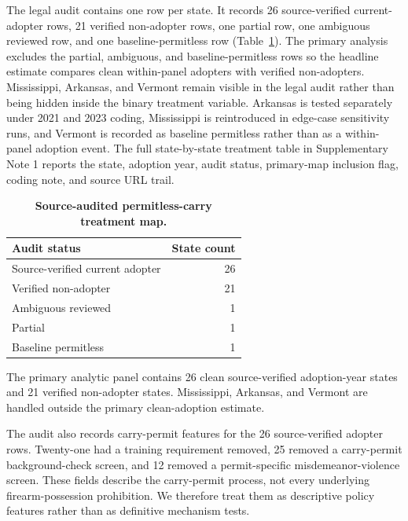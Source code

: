 \documentclass[11pt]{article}
\begin{document}
The legal audit contains one row per state. It records 26 source-verified current-adopter rows, 21 verified non-adopter rows, one partial row, one ambiguous reviewed row, and one baseline-permitless row (Table~\ref{tab:audit}). The primary analysis excludes the partial, ambiguous, and baseline-permitless rows so the headline estimate compares clean within-panel adopters with verified non-adopters. Mississippi, Arkansas, and Vermont remain visible in the legal audit rather than being hidden inside the binary treatment variable. Arkansas is tested separately under 2021 and 2023 coding, Mississippi is reintroduced in edge-case sensitivity runs, and Vermont is recorded as baseline permitless rather than as a within-panel adoption event. The full state-by-state treatment table in Supplementary Note 1 reports the state, adoption year, audit status, primary-map inclusion flag, coding note, and source URL trail.

\begin{table}[H]
\centering
\caption{\textbf{Source-audited permitless-carry treatment map.}}
\label{tab:audit}
\begin{threeparttable}
\begin{tabular}{lr}
\toprule
Audit status & State count \\
\midrule
Source-verified current adopter & 26 \\
Verified non-adopter & 21 \\
Ambiguous reviewed & 1 \\
Partial & 1 \\
Baseline permitless & 1 \\
\bottomrule
\end{tabular}
\begin{tablenotes}
\small
\item The primary analytic panel contains 26 clean source-verified adoption-year states and 21 verified non-adopter states. Mississippi, Arkansas, and Vermont are handled outside the primary clean-adoption estimate.
\end{tablenotes}
\end{threeparttable}
\end{table}

The audit also records carry-permit features for the 26 source-verified adopter rows. Twenty-one had a training requirement removed, 25 removed a carry-permit background-check screen, and 12 removed a permit-specific misdemeanor-violence screen. These fields describe the carry-permit process, not every underlying firearm-possession prohibition. We therefore treat them as descriptive policy features rather than as definitive mechanism tests.
\end{document}
